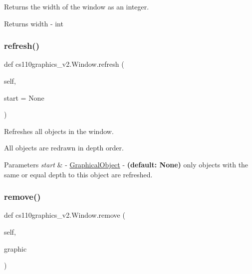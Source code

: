 Returns the width of the window as an integer. 

\begin{DoxyReturn}{Returns}
width -\/ int 
\end{DoxyReturn}
\mbox{\label{classcs110graphics__v2_1_1Window_a15dd1072a18c76df818f061b28009120}} 
\subsubsection{\texorpdfstring{refresh()}{refresh()}}
{\footnotesize\ttfamily def cs110graphics\+\_\+v2.\+Window.\+refresh (\begin{DoxyParamCaption}\item[{}]{self,  }\item[{}]{start = {\ttfamily None} }\end{DoxyParamCaption})}



Refreshes all objects in the window. 

All objects are redrawn in depth order. 
\begin{DoxyParams}{Parameters}
{\em start} & -\/ \mbox{\hyperlink{classcs110graphics__v2_1_1GraphicalObject}{Graphical\+Object}} -\/ {\bfseries{(default\+: None)}} only objects with the same or equal depth to this object are refreshed. \\
\hline
\end{DoxyParams}
\mbox{\label{classcs110graphics__v2_1_1Window_a684106ecf2dbfb9159731afb7698e238}} 
\subsubsection{\texorpdfstring{remove()}{remove()}}
{\footnotesize\ttfamily def cs110graphics\+\_\+v2.\+Window.\+remove (\begin{DoxyParamCaption}\item[{}]{self,  }\item[{}]{graphic }\end{DoxyParamCaption})}



